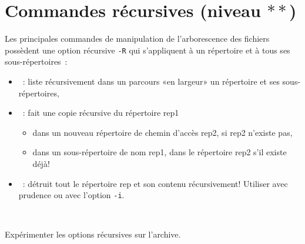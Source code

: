 \documentclass[a4paper,11pt]{article}
\begin{document}
\section{Commandes récursives (niveau $**$)}

Les principales commandes de manipulation de l'arborescence des
fichiers possèdent une option récursive \verb!-R! qui s'appliquent à un
répertoire et à tous ses sous-répertoires :

\begin{itemize}

  \item {} : liste récursivement dans un parcours «en
        largeur» un répertoire et ses sous-répertoires,\\
  \item {} : fait une copie récursive du répertoire
        rep1
        \begin{itemize}
            \item  dans un nouveau répertoire de chemin d'accès rep2, si rep2
                   n'existe pas,
            \item dans un sous-répertoire de nom rep1, dans le répertoire rep2
                  s'il existe déjà!\\
          \end{itemize}
  \item {} : détruit tout le répertoire rep et son contenu
        récursivement! Utiliser avec prudence ou avec l'option \verb!-i!.
\end{itemize}

\

\begin{maw}

Expérimenter les options récursives sur l'archive.

\end{maw}

\begin{comment}
\begin{danger}
Pour la suite du sujet, tapez la commande suivante dans un terminal
\begin{verbatim}
echo $SHELL
\end{verbatim}
Si le résultat est \verb+/bin/tcsh+, les sections \ref{alias_tcsh}, \ref{tcsh}, \ref{cshrc} et
\ref{grep} terminent le sujet.

Si le résultat est \verb+/bin/bash+, les sections \ref{alias_bash}, \ref{bash}, \ref{bashrc} et
\ref{grep} terminent le sujet.
 
\end{danger}
\end{comment}
\end{document}
